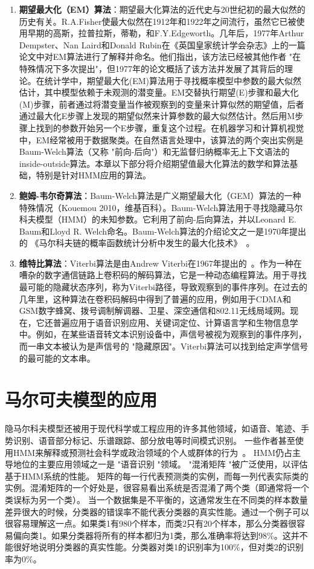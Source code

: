 \documentclass[degree=project, degree-type=project]{thuthesis}
\begin{document}
\begin{enumerate}
	\item \textbf{期望最大化（EM）算法}：期望最大化算法的近代史与20世纪初的最大似然的历史有关。R.A.Fisher使最大似然在1912年和1922年之间流行，虽然它已被使用早期的高斯，拉普拉斯，蒂勒，和F.Y.Edgeworth。几年后，1977年Arthur Dempster、Nan Laird和Donald Rubin在《英国皇家统计学会杂志》上的一篇论文中对EM算法进行了解释并命名。他们指出，该方法已经被其他作者 "在特殊情况下多次提出"，但1977年的论文概括了该方法并发展了其背后的理论。在统计学中，期望最大化(EM)算法用于寻找概率模型中参数的最大似然估计，其中模型依赖于未观测的潜变量。EM交替执行期望(E)步骤和最大化(M)步骤，前者通过将潜变量当作被观察到的变量来计算似然的期望值，后者通过最大化E步骤上发现的期望似然来计算参数的最大似然估计。然后用M步骤上找到的参数开始另一个E步骤，重复这个过程。在机器学习和计算机视觉中，EM经常被用于数据聚类。在自然语言处理中，该算法的两个突出实例是Baum-Welch算法（又称 "前向-后向"）和无监督归纳概率无上下文语法的inside-outside算法。本章以下部分将介绍期望值最大化算法的数学和算法基础，特别是针对HMM应用的算法。
	\item \textbf{鲍姆-韦尔奇算法}：Baum-Welch算法是广义期望最大化（GEM）算法的一种特殊情况（Kouemou 2010，维基百科）。Baum-Welch算法用于寻找隐藏马尔科夫模型（HMM）的未知参数。它利用了前向-后向算法，并以Leonard E. Baum和Lloyd R. Welch命名。Baum-Welch算法的介绍论文之一是1970年提出的 《马尔科夫链的概率函数统计分析中发生的最大化技术》~\cite{GEM}。
	\item \textbf{维特比算法}：Viterbi算法是由Andrew Viterbi在1967年提出的~\cite{Viterbi}。作为一种在嘈杂的数字通信链路上卷积码的解码算法，它是一种动态编程算法。用于寻找最可能的隐藏状态序列，称为Viterbi路径，导致观察到的事件序列。在过去的几年里，这种算法在卷积码解码中得到了普遍的应用，例如用于CDMA和GSM数字蜂窝、拨号调制解调器、卫星、深空通信和802.11无线局域网。现在，它还普遍应用于语音识别应用、关键词定位、计算语言学和生物信息学中。例如，在某些语音转文本识别设备中，声信号被视为观察到的事件序列，而一串文本被认为是声信号的 "隐藏原因"。Viterbi算法可以找到给定声学信号的最可能的文本串。
\end{enumerate}

\section{马尔可夫模型的应用}

隐马尔科夫模型还被用于现代科学或工程应用的许多其他领域，如语音、笔迹、手势识别、语音部分标记、乐谱跟踪、部分放电等时间模式识别。
一些作者甚至使用HMM来解释或预测社会科学或政治领域的个人或群体的行为~\cite{Schrodt2006}。
HMM仍占主导地位的主要应用领域之一是 "语音识别 "领域。
"混淆矩阵 "被广泛使用，以评估基于HMM系统的性能。
矩阵的每一行代表预测类的实例，而每一列代表实际类的实例。混淆矩阵的一个好处是，很容易看出系统是否混淆了两个类（即通常将一个类误标为另一个类）。
当一个数据集是不平衡的，这通常发生在不同类的样本数量差异很大的时候，分类器的错误率不能代表分类器的真实性能。通过一个例子可以很容易理解这一点。如果类1有980个样本，而类2只有20个样本，那么分类器很容易偏向类1。如果分类器将所有的样本都归为1类，那么准确率将达到98\%。这并不能很好地说明分类器的真实性能。分类器对类1的识别率为100\%，但对类2的识别率为0\%。
\end{document}

